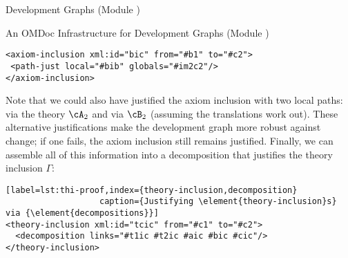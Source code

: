 \begin{omgroup}[id=complex-theories,short=Complex Theories,
                            creators=miko,contributors=frabe]
\begin{omgroup}[id=development-graphs,short=Development Graphs]{Development Graphs (Module
  {})}
\begin{module}[id=dgraph]
\begin{omgroup}[id=dg-omdoc,short=OMDoc Development Graphs]{An OMDoc Infrastructure for
  Development Graphs (Module {})}
\begin{lstlisting}[label=lst:thi-induced-inclusions,index={path-just,axiom-inclusion},
                   caption={The Induced Axiom Inclusions in {\myfigref{thi-proof}}.}]
<axiom-inclusion xml:id="bic" from="#b1" to="#c2">
 <path-just local="#bib" globals="#im2c2"/>
</axiom-inclusion>
\end{lstlisting}
Note that we could also have justified the axiom inclusion {} with
two local paths: via the theory $\cA_2$ and via $\cB_2$ (assuming the translations
work out).  These alternative justifications make the development graph more
robust against change; if one fails, the axiom inclusion still remains justified.
Finally, we can assemble all of this information into a decomposition that
justifies the theory inclusion $\Gamma$:
\begin{lstlisting}[label=lst:thi-proof,index={theory-inclusion,decomposition}
                   caption={Justifying \element{theory-inclusion}s} via {\element{decompositions}}]
<theory-inclusion xml:id="tcic" from="#c1" to="#c2">
  <decomposition links="#t1ic #t2ic #aic #bic #cic"/>
</theory-inclusion>
\end{lstlisting}
\end{omgroup}
\end{module}
\end{omgroup}
\end{omgroup}

